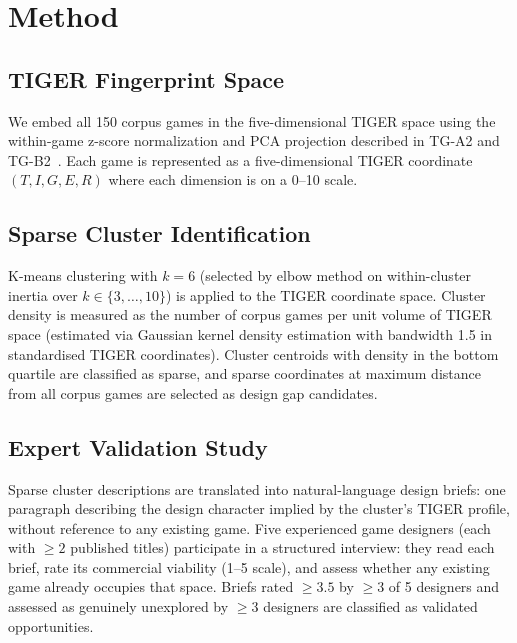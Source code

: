 \section{Method}
\label{sec:method}

\subsection{TIGER Fingerprint Space}

We embed all 150 corpus games in the five-dimensional TIGER space using the
within-game z-score normalization and PCA projection described in TG-A2 and
TG-B2~\cite{dellaLibera2026pca, dellaLibera2026fingerprint}. Each game is represented
as a five-dimensional TIGER coordinate $(T, I, G, E, R)$ where each dimension is
on a 0--10 scale.

\subsection{Sparse Cluster Identification}

K-means clustering with $k = 6$ (selected by elbow method on within-cluster inertia
over $k \in \{3, \ldots, 10\}$) is applied to the TIGER coordinate space.
Cluster density is measured as the number of corpus games per unit volume of
TIGER space (estimated via Gaussian kernel density estimation with bandwidth 1.5 in
standardised TIGER coordinates). Cluster centroids with density in the bottom quartile
are classified as sparse, and sparse coordinates at maximum distance from all corpus games
are selected as design gap candidates.

\subsection{Expert Validation Study}

Sparse cluster descriptions are translated into natural-language design briefs:
one paragraph describing the design character implied by the cluster's TIGER
profile, without reference to any existing game. Five experienced game designers
(each with $\geq 2$ published titles) participate in a structured interview:
they read each brief, rate its commercial viability (1--5 scale), and assess
whether any existing game already occupies that space. Briefs rated $\geq 3.5$
by $\geq 3$ of 5 designers and assessed as genuinely unexplored by $\geq 3$
designers are classified as validated opportunities.
